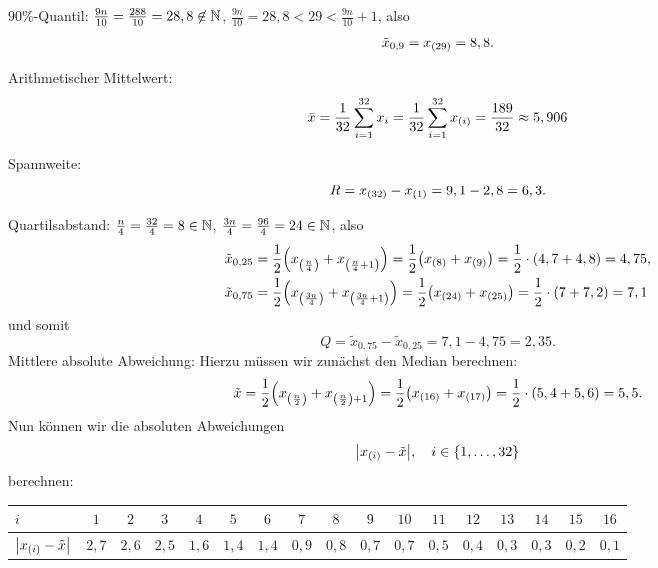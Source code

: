 \documentclass{exercise}
\begin{document}
\begin{enumerate}
        \(90\%\)-Quantil:
        \(\frac{9n}{10} = \frac{288}{10} = 28,8 \not\in \N\), \(\frac{9n}{10} = 28,8 < 29 < \frac{9n}{10} + 1\), also
        \[
            \tilde{x}_{0,9} = x_{\parentheses*{29}} = 8,8.
        \]

        Arithmetischer Mittelwert:
        \[
            \bar{x} = \frac{1}{32}\sum_{i = 1}^{32}x_i = \frac{1}{32}\sum_{i = 1}^{32}x_{\parentheses*{i}} = \frac{189}{32} \approx 5,906
        \]

        Spannweite:
        \[
            R = x_{\parentheses*{32}} - x_{\parentheses*{1}} = 9,1 - 2,8 = 6,3.
        \]

        Quartilsabstand: \(\frac{n}{4} = \frac{32}{4} = 8 \in \N\), \(\frac{3n}{4} = \frac{96}{4} = 24 \in \N\), also
        \begin{align*}
            \tilde{x}_{0,25} &= \frac{1}{2}\parentheses*{x_{\parentheses*{\frac{n}{4}}} + x_{\parentheses*{\frac{n}{4} + 1}}} = \frac{1}{2}\parentheses*{x_{\parentheses*{8}} + x_{\parentheses*{9}}} = \frac{1}{2} \cdot \parentheses*{4,7 + 4,8} = 4,75,\\
            \tilde{x}_{0,75} &= \frac{1}{2}\parentheses*{x_{\parentheses*{\frac{3n}{4}}} + x_{\parentheses*{\frac{3n}{4} + 1}}} = \frac{1}{2}\parentheses*{x_{\parentheses*{24}} + x_{\parentheses*{25}}} = \frac{1}{2} \cdot \parentheses*{7 + 7,2} = 7,1
        \end{align*}
        und somit
        \[
            Q = \tilde{x}_{0,75} - \tilde{x}_{0,25} = 7,1 - 4,75 = 2,35.
        \]
        Mittlere absolute Abweichung: Hierzu müssen wir zunächst den Median berechnen:
        \[
            \tilde{x} = \frac{1}{2}\parentheses*{x_{\parentheses*{\frac{n}{2}}} + x_{\parentheses*{\frac{n}{2}} + 1}} = \frac{1}{2}\parentheses*{x_{\parentheses*{16}} + x_{\parentheses*{17}}} = \frac{1}{2} \cdot \parentheses*{5,4 + 5,6} = 5,5.
        \]
        Nun können wir die absoluten Abweichungen
        \[
            \absolute*{x_{\parentheses*{i}} - \tilde{x}}, \quad i \in \braces*{1, \ldots, 32}
        \]
        berechnen:
        \begin{center}
            \begin{tabular}{lcccccccccccccccc}
                \toprule
                \(i\) & \(1\) & \(2\) & \(3\) & \(4\) & \(5\) & \(6\) & \(7\) & \(8\) & \(9\) & \(10\) & \(11\) & \(12\) & \(13\) & \(14\) & \(15\) & \(16\)\\
                \midrule
                \(\absolute*{x_{\parentheses*{i}} - \tilde{x}}\) & \(2,7\) & \(2,6\) & \(2,5\) & \(1,6\) & \(1,4\) & \(1,4\) & \(0,9\) & \(0,8\) & \(0,7\) & \(0,7\) & \(0,5\) & \(0,4\) & \(0,3\) & \(0,3\) & \(0,2\) & \(0,1\)\\

\end{tabular}
\end{center}
\end{enumerate}
\end{document}
